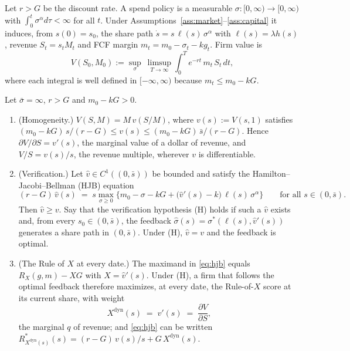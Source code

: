 Let $r>G$ be the discount rate. A spend policy is a measurable $\sigma:[0,\infty)\to[0,\infty)$ with $\int_0^t\sigma^{\alpha}d\tau<\infty$ for all $t$. Under Assumptions~\ref{ass:market}--\ref{ass:capital} it induces, from $s(0)=s_0$, the share path $\dot s=s\,\ell(s)\,\sigma^{\alpha}$ with $\ell(s)=\lambda h(s)$, revenue $S_t=s_tM_t$ and FCF margin $m_t=m_0-\sigma_t-kg_t$. Firm value is
\begin{equation}\label{eq:value}
V(S_0,M_0):=\sup_{\sigma}\ \limsup_{T\to\infty}\int_0^Te^{-rt}\,m_t\,S_t\,dt,
\end{equation}
where each integral is well defined in $[-\infty,\infty)$ because $m_t\le m_0-kG$.

\begin{proposition}\label{prop:dynamic}
Let $\bar\sigma=\infty$, $r>G$ and $m_0-kG>0$.
\begin{enumerate}
\item[(a)] (Homogeneity.) $V(S,M)=M\,v(S/M)$, where $v(s):=V(s,1)$ satisfies $(m_0-kG)\,s/(r-G)\le v(s)\le(m_0-kG)\,\bar s/(r-G)$. Hence $\partial V/\partial S=v'(s)$, the marginal value of a dollar of revenue, and $V/S=v(s)/s$, the revenue multiple, wherever $v$ is differentiable.
\item[(b)] (Verification.) Let $\hat v\in C^1((0,\bar s))$ be bounded and satisfy the Hamilton--Jacobi--Bellman (HJB) equation
\begin{equation}\label{eq:hjb}
(r-G)\,\hat v(s)\;=\;s\max_{\sigma\ge 0}\bigl\{m_0-\sigma-kG+\bigl(\hat v'(s)-k\bigr)\,\ell(s)\,\sigma^{\alpha}\bigr\}\qquad\text{for all }s\in(0,\bar s).
\end{equation}
Then $\hat v\ge v$. Say that the verification hypothesis (H) holds if such a $\hat v$ exists and, from every $s_0\in(0,\bar s)$, the feedback $\hat\sigma(s)=\sigma^*(\ell(s),\hat v'(s))$ generates a share path in $(0,\bar s)$. Under (H), $\hat v=v$ and the feedback is optimal.
\item[(c)] (The Rule of $X$ at every date.) The maximand in \eqref{eq:hjb} equals $R_X(g,m)-XG$ with $X=\hat v'(s)$. Under (H), a firm that follows the optimal feedback therefore maximizes, at every date, the Rule-of-$X$ score at its current share, with weight
\begin{equation}\label{eq:Xdyn}
X^{\mathrm{dyn}}(s)\;=\;v'(s)\;=\;\frac{\partial V}{\partial S},
\end{equation}
the marginal $q$ of revenue; and \eqref{eq:hjb} can be written $R^*_{X^{\mathrm{dyn}}(s)}(s)=(r-G)\,v(s)/s+G\,X^{\mathrm{dyn}}(s)$.

\end{enumerate}
\end{proposition}
